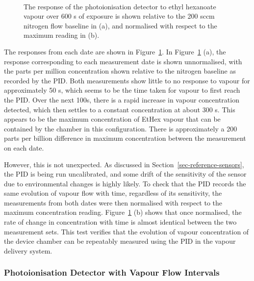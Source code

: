 \documentclass[
  a4paper,
]{scrbook}
\begin{document}
\begin{figure}
\begin{minipage}[t]{0.70\linewidth}
{}

\end{minipage}%
%
\begin{minipage}[t]{0.15\linewidth}

{\centering 

~

}

\end{minipage}%

\caption{\label{fig-PID-EtHex-response}The response of the
photoionisation detector to ethyl hexanoate vapour over 600 s of
exposure is shown relative to the 200 sccm nitrogen flow baseline in
(a), and normalised with respect to the maximum reading in (b).}

\end{figure}

The responses from each date are shown in
Figure~\ref{fig-PID-EtHex-response}. In
Figure~\ref{fig-PID-EtHex-response} (a), the response corresponding to
each measurement date is shown unnormalised, with the parts per million
concentration shown relative to the nitrogen baseline as recorded by the
PID. Both measurements show little to no response to vapour for
approximately 50 s, which seems to be the time taken for vapour to first
reach the PID. Over the next 100s, there is a rapid increase in vapour
concentration detected, which then settles to a constant concentration
at about 300 s. This appears to be the maximum concentration of EtHex
vapour that can be contained by the chamber in this configuration. There
is approximately a 200 parts per billion difference in maximum
concentration between the measurement on each date.

However, this is not unexpected. As discussed in
Section~\ref{sec-reference-sensors}, the PID is being run uncalibrated,
and some drift of the sensitivity of the sensor due to environmental
changes is highly likely. To check that the PID records the same
evolution of vapour flow with time, regardless of its sensitivity, the
measurements from both dates were then normalised with respect to the
maximum concentration reading. Figure~\ref{fig-PID-EtHex-response} (b)
shows that once normalised, the rate of change in concentration with
time is almost identical between the two measurement sets. This test
verifies that the evolution of vapour concentration of the device
chamber can be repeatably measured using the PID in the vapour delivery
system.

\hypertarget{photoionisation-detector-with-vapour-flow-intervals}{%
\subsubsection*{Photoionisation Detector with Vapour Flow
Intervals}\label{photoionisation-detector-with-vapour-flow-intervals}}
\end{document}
